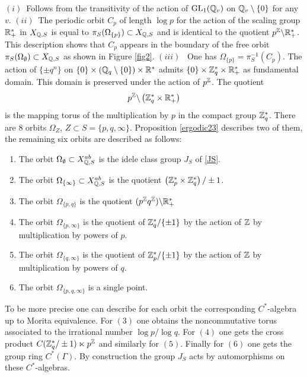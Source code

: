 \proof $(i)$~Follows from the transitivity of the action of ${\rm GL}_1({\mathbb Q}_v)$ on ${\mathbb Q}_v\setminus \{0\}$ for any  $v$.\newline
$(ii)$~The periodic orbit $C_p$ of length $\log p$  for the action  of the scaling group $\mathbb{R}_+^*$ in $X_{{\mathbb Q},S}$ is equal to $\pi_S(\Omega_{\{p\}})\subset X_{{\mathbb Q},S}$ and is identical to the quotient $p^{\mathbb{Z}}\backslash\mathbb{R}_+^*$. This description shows that $C_p$ appears in the boundary of the free orbit $\pi_S(\Omega_{\emptyset})\subset X_{{\mathbb Q},S}$ as shown in Figure \ref{fig2}.  \newline
$(iii)$~ One has $\Omega_{\{p\}}=\pi_S^{-1}(C_p)$. The action of $\{\pm q^n\}$ on $\{0\}\times \left({\mathbb Q}_q\setminus \{0\}\right)\times \mathbb{R}^*$ admits $\{0\}\times \mathbb{Z}_q^*\times \mathbb{R}_+^*$ as fundamental domain. This domain is preserved under the action of $p^{\mathbb{Z}}$. The quotient 
$$
p^{\mathbb{Z}}\backslash\left(\mathbb{Z}_q^*\times \mathbb{R}_+^*\right)
$$
is the mapping torus of the multiplication by $p$ in the compact group $ \mathbb{Z}_q^*$.
\endproof
There are $8$ orbits $\Omega_Z$,  $Z\subset S=\{p,q,\infty\}$.  Proposition \ref{ergodic23} describes two of them, the remaining six orbits are described as follows:
\begin{enumerate}
     \item The orbit $\Omega_{\emptyset}\subset X_{{\mathbb Q},S}^{ab}$  is the idele class group $J_S$ of  \eqref{JS}.
   \item The orbit $\Omega_{\{\infty\}}\subset X_{{\mathbb Q},S}^{ab}$ is the quotient $\left(\mathbb{Z}_p^*\times \mathbb{Z}_q^*\right)/\pm 1$. 
   \item  The orbit $\Omega_{\{p,q\}}$ is the quotient $(p^{\mathbb{Z}} q^{\mathbb{Z}})\backslash\mathbb{R}_+^*$   \item  The orbit $\Omega_{\{p,\infty\}}$ is the quotient  of $ \mathbb{Z}_q^*/\{\pm 1\}$ by the action of $\mathbb{Z}$ by multiplication by powers of $p$. 
   \item  The orbit $\Omega_{\{q,\infty\}}$ is the quotient  of $ \mathbb{Z}_p^*/\{\pm 1\}$ by the action of $\mathbb{Z}$ by multiplication by powers of $q$. 
   \item The orbit  $\Omega_{\{p,q,\infty\}}$ is a single point.
\end{enumerate}
To be more precise one can describe for each orbit the corresponding $C^*$-algebra up to Morita equivalence. For $(3)$ one obtains the noncommutative torus associated to the irrational number $\log p /\log q$. For $(4)$ one gets the cross product  $
C(\mathbb{Z}_q^*/\pm 1)\ltimes p^{\mathbb{Z}}
$
and similarly for $(5)$. Finally for $(6)$ one gets the group ring $C^*(\Gamma)$. By construction the group $J_S$ acts by automorphisms on these $C^*$-algebras.
\vspace{-.2in}

